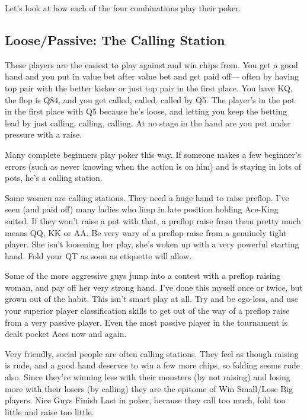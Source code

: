 Let's look at how each of the four combinations play their poker.

\subsection{Loose/Passive: The Calling Station}

These players are the easiest to play against and win chips from.
You get a good hand and you put in value bet after value bet and
get paid off--- often by having top pair with the better kicker or
just top pair in the first place. You have KQ, the flop is Q84, and
you get called, called, called by Q5. The player's in the pot in the
first place with Q5 because he's loose, and letting you keep the
betting lead by just calling, calling, calling. At no stage in
the hand are you put under pressure with a raise.

Many complete beginners play poker this way. If someone makes
a few beginner's errors (such as never knowing when the action
is on him) and is staying in lots of pots, he's a calling station.



Some women are calling stations. They
need a huge hand to raise preflop. I've seen
(and paid off) many ladies who limp in late position holding
Ace-King suited. If they won't raise a pot with that, a preflop
raise from them pretty much means QQ, KK or AA. Be very wary
of a preflop raise from a genuinely tight player. She isn't
loosening her play, she's woken up with a very powerful starting
hand. Fold your QT as soon as etiquette will allow.

Some of the more aggressive guys jump into a contest with a
preflop raising woman, and pay off her very strong hand. I've
done this myself once or twice, but grown out of the habit. This
isn't smart play at all. Try and be ego-less, and use your
superior player classification skills to get out of the way
of a preflop raise from a very passive player. Even the most
passive player in the tournament is dealt pocket Aces now and
again.

Very friendly, social people are often calling stations.
They feel as though raising is rude, and a good hand deserves
to win a few more chips, so folding seems rude also. Since
they're winning less with their monsters (by not raising)
and losing more with their losers (by calling) they are
the epitome of Win Small/Lose Big players. Nice Guys
Finish Last in poker, because they call too much, fold
too little and raise too little.


